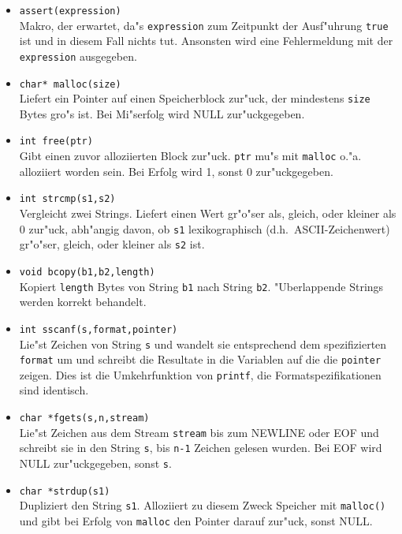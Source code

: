 \begin{itemize}
	\item {\tt assert(expression)}\\
		Makro, der erwartet, da"s {\tt expression} zum Zeitpunkt der Ausf"uhrung
		{\tt true} ist und in diesem Fall nichts tut. Ansonsten wird eine 
		Fehlermeldung mit der {\tt expression} ausgegeben.
	\item {\tt char* malloc(size)}\\
		Liefert ein Pointer auf einen Speicherblock zur"uck, der mindestens 
		{\tt size}
		Bytes gro"s ist. Bei Mi"serfolg wird NULL zur"uckgegeben.
	\item {\tt int free(ptr)}\\
		Gibt einen zuvor alloziierten Block zur"uck. {\tt ptr} mu"s mit 
		{\tt malloc} o."a. alloziiert worden sein. Bei Erfolg wird 1, sonst
 		0 zur"uckgegeben.
	\item {\tt int strcmp(s1,s2)}\\
		Vergleicht zwei Strings. Liefert einen Wert gr"o"ser als, gleich, oder
		kleiner als 0 zur"uck, abh"angig davon, ob {\tt s1} lexikographisch
		(d.h.~ASCII-Zeichenwert) gr"o"ser, gleich, oder 
		kleiner als {\tt s2} ist.	
	\item {\tt void bcopy(b1,b2,length)}\\
		Kopiert {\tt length} Bytes von String {\tt b1} nach String {\tt b2}. 
		"Uberlappende Strings werden korrekt behandelt.
	\item {\tt int sscanf(s,format,pointer)}\\
		Lie"st Zeichen von String {\tt s} und wandelt sie entsprechend dem
		spezifizierten {\tt format} um und schreibt die Resultate in die Variablen
		auf die die {\tt pointer} zeigen. Dies ist die Umkehrfunktion 
		von {\tt printf}, die Formatspezifikationen sind identisch. 
	\item {\tt char *fgets(s,n,stream)}\\
		Lie"st Zeichen aus dem Stream {\tt stream} bis zum NEWLINE oder EOF und
		schreibt sie in den String {\tt s}, bis {\tt n-1} Zeichen gelesen wurden.
		Bei EOF wird NULL zur"uckgegeben, sonst {\tt s}.
	\item {\tt char *strdup(s1)}\\
		Dupliziert den String {\tt s1}. Alloziiert zu diesem Zweck Speicher
		mit {\tt malloc()} und gibt bei Erfolg von {\tt malloc} den 
		Pointer darauf zur"uck, sonst NULL.
\end{itemize}

